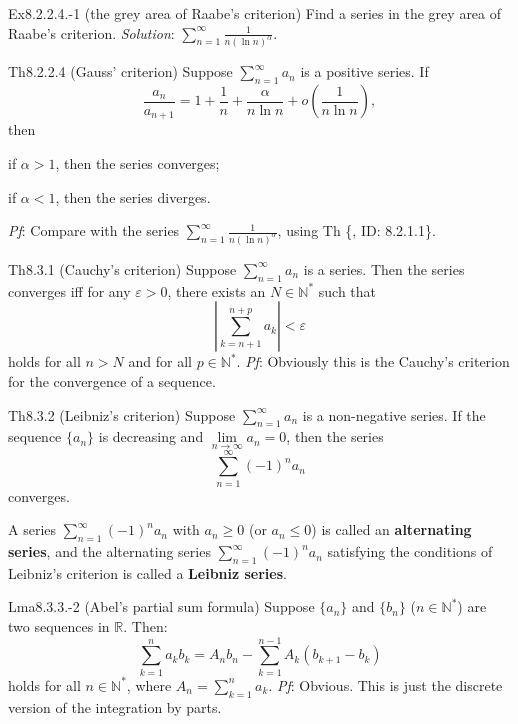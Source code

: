 \documentclass{article}
\begin{document}
\begin{Th}{Ex8.2.2.4.-1 (the grey area of Raabe's criterion)}
    Find a series in the grey area of Raabe's criterion.
    \tcblower
    \textit{Solution}: $\sum_{n=1}^{\infty} \frac{1}{n(\ln n)^\alpha}$.
\end{Th}

\begin{Th}{Th8.2.2.4 (Gauss' criterion)}
    Suppose $\sum_{n=1}^{\infty} a_n$ is a positive series. If
    $$ \frac{a_n}{a_{n+1}} = 1 + \frac{1}{n} + \frac{\alpha}{n\ln n} + o\left(\frac{1}{n\ln n}\right), $$
    then
    \begin{compactenum}
        \item if $\alpha > 1$, then the series converges;
        \item if $\alpha < 1$, then the series diverges.
    \end{compactenum}
    \tcblower
    \textit{Pf}: Compare with the series $\sum_{n=1}^{\infty} \frac{1}{n(\ln n)^\alpha}$, using Th \{, ID: 8.2.1.1\}.
\end{Th}

\begin{Th}{Th8.3.1 (Cauchy's criterion)}
    Suppose $\sum_{n=1}^{\infty} a_n$ is a series. Then the series converges iff for any $\varepsilon>0$, there exists an $N\in\mathbb{N}^\ast$ such that
    $$ \left|\sum_{k=n+1}^{n+p} a_k\right| < \varepsilon $$
    holds for all $n>N$ and for all $p\in\mathbb{N}^\ast$.
    \tcblower
    \textit{Pf}: Obviously this is the Cauchy's criterion for the convergence of a sequence.
\end{Th}

\begin{Th}{Th8.3.2 (Leibniz's criterion)}
    Suppose $\sum_{n=1}^{\infty} a_n$ is a non-negative series. If the sequence $\{a_n\}$ is decreasing and $\lim\limits_{n\to\infty} a_n = 0$, then the series
    $$ \sum_{n=1}^{\infty} (-1)^{n} a_n $$
    converges.
\end{Th}

\begin{Rmk}{}
    \textcolor{Df}{A series $\sum_{n=1}^{\infty} (-1)^n a_n$ with $a_n\geq 0$ (or $a_n\leq 0$) is called an \textbf{alternating series}, and the alternating series $\sum_{n=1}^{\infty} (-1)^n a_n$ satisfying the conditions of Leibniz's criterion is called a \textbf{Leibniz series}.}
\end{Rmk}

\begin{Th}{Lma8.3.3.-2 (Abel's partial sum formula)}
    Suppose $\{a_n\}$ and $\{b_n\}$ ($n\in\mathbb{N}^\ast$) are two sequences in $\mathbb{R}$. Then:
    $$ \sum_{k=1}^{n} a_k b_k = A_n b_n - \sum_{k=1}^{n-1} A_k(b_{k+1}-b_k) $$
    holds for all $n\in\mathbb{N}^\ast$, where $A_n = \sum_{k=1}^{n} a_k$.
    \tcblower
    \textit{Pf}: Obvious. This is just the discrete version of the integration by parts.
\end{Th}
\end{document}

